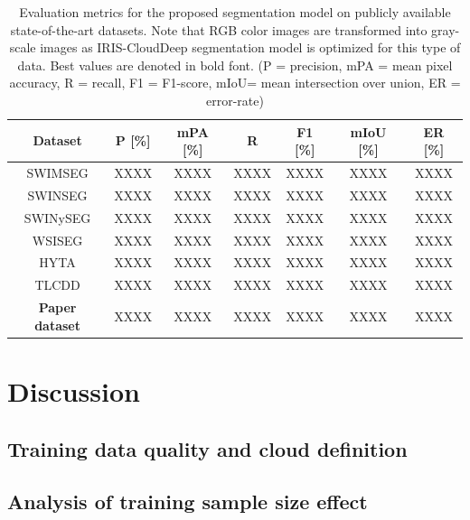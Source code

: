 \documentclass[amt, article]{copernicus}
\begin{document}
\begin{table}[t]
    \begin{center}
        \caption{Evaluation metrics for the proposed segmentation model on publicly available state-of-the-art datasets. Note that RGB color images are transformed into gray-scale images as IRIS-CloudDeep segmentation model is optimized for this type of data. Best values are denoted in bold font. (P = precision, mPA = mean pixel accuracy, R = recall, F1 = F1-score, mIoU= mean intersection over union, ER = error-rate)}
        \begin{tabular}{c c c c c c c} 
        \tophline \hline
         Dataset & P [\%] & mPA [\%] & R & F1 [\%] & mIoU [\%] & ER [\%] \\ [1.0ex]
         \hline
         SWIMSEG & XXXX & XXXX & XXXX & XXXX & XXXX & XXXX \\ [1.0ex]
         SWINSEG & XXXX & XXXX & XXXX & XXXX & XXXX & XXXX \\ [1.0ex]
         SWINySEG & XXXX & XXXX & XXXX & XXXX & XXXX & XXXX \\ [1.0ex]
         WSISEG & XXXX & XXXX & XXXX & XXXX & XXXX & XXXX \\ [1.0ex]
         HYTA & XXXX & XXXX & XXXX & XXXX & XXXX & XXXX \\ [1.0ex]
         TLCDD & XXXX & XXXX & XXXX & XXXX & XXXX & XXXX \\ [1.0ex]
         \textbf{Paper dataset} & XXXX & XXXX & XXXX & XXXX & XXXX & XXXX \\
         \hline
        \end{tabular}
        \belowtable{}
        \end{center}
    \end{table}


\section{Discussion}
\label{sec:discussion}

\subsection{Training data quality and cloud definition}

\subsection{Analysis of training sample size effect}
\end{document}
